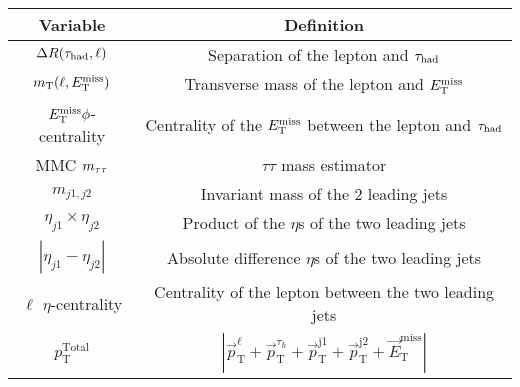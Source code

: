 \begin{tabular}{c|c}
  Variable                        & Definition                                              \\
  \hline
  $\Delta R(\tau_\text{had}, \ell)$         & Separation of the lepton and $\tau_\text{had}$                    \\
  $m_\text{T}(\ell, E_{\mathrm{T}}^{\mathrm{miss}})$                           & Transverse mass of the lepton and $E_{\mathrm{T}}^{\mathrm{miss}}$                \\
  $E_{\mathrm{T}}^{\mathrm{miss}}\phi$-centrality           & Centrality of the $E_{\mathrm{T}}^{\mathrm{miss}}$ between the lepton and $\tau_\text{had}$ \\
  MMC $m_{\tau\tau}$                  & $\tau\tau$ mass estimator                               \\
  $m_{j1,j2}$                     & Invariant mass of the 2 leading jets                    \\
  $\eta_{j1}\times\eta_{j2}$      & Product of the $\eta$s of the two leading jets          \\
  $|\eta_{j1} - \eta_{j2}|$       & Absolute difference $\eta$s of the two leading jets     \\
  $\ell$ $\eta$-centrality        & Centrality of the lepton between the two leading jets   \\
  $p_{\text{T}}^{\mathrm{Total}}$ & $|\vec{p}_{\mathrm{T}}^{\ell} + \vec{p}_{\mathrm{T}}^{\tau_h} + \vec{p}_{\mathrm{T}}^{\mathrm{j1}} + \vec{p}_{\mathrm{T}}^{\mathrm{j2}} + \vec{E}_{\mathrm{T}}^{\mathrm{miss}}|$ \\   
\end{tabular}

